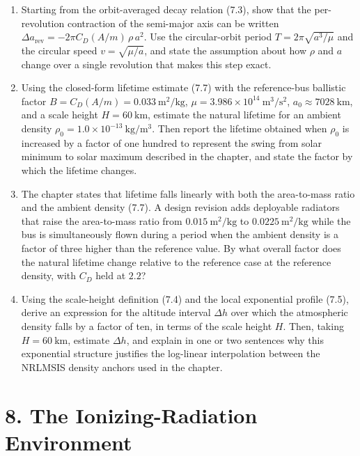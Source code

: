 \documentclass[
  11pt,
  openany,
  oneside]{book}
\begin{document}
\begin{enumerate}
\def\labelenumi{\arabic{enumi}.}
\item
  Starting from the orbit-averaged decay relation (7.3), show that the
  per-revolution contraction of the semi-major axis can be written
  \(\Delta a_{\mathrm{rev}} = -2\pi C_D (A/m)\,\rho\, a^2\). Use the
  circular-orbit period \(T = 2\pi\sqrt{a^3/\mu}\) and the circular
  speed \(v = \sqrt{\mu/a}\), and state the assumption about how
  \(\rho\) and \(a\) change over a single revolution that makes this
  step exact.
\item
  Using the closed-form lifetime estimate (7.7) with the reference-bus
  ballistic factor \(B = C_D(A/m) = 0.033\ \mathrm{m^2/kg}\),
  \(\mu = 3.986\times 10^{14}\ \mathrm{m^3/s^2}\),
  \(a_0 \approx 7028\ \mathrm{km}\), and a scale height
  \(H = 60\ \mathrm{km}\), estimate the natural lifetime for an ambient
  density \(\rho_0 = 1.0\times 10^{-13}\ \mathrm{kg/m^3}\). Then report
  the lifetime obtained when \(\rho_0\) is increased by a factor of one
  hundred to represent the swing from solar minimum to solar maximum
  described in the chapter, and state the factor by which the lifetime
  changes.
\item
  The chapter states that lifetime falls linearly with both the
  area-to-mass ratio and the ambient density (7.7). A design revision
  adds deployable radiators that raise the area-to-mass ratio from
  \(0.015\ \mathrm{m^2/kg}\) to \(0.0225\ \mathrm{m^2/kg}\) while the
  bus is simultaneously flown during a period when the ambient density
  is a factor of three higher than the reference value. By what overall
  factor does the natural lifetime change relative to the reference case
  at the reference density, with \(C_D\) held at \(2.2\)?
\item
  Using the scale-height definition (7.4) and the local exponential
  profile (7.5), derive an expression for the altitude interval
  \(\Delta h\) over which the atmospheric density falls by a factor of
  ten, in terms of the scale height \(H\). Then, taking
  \(H = 60\ \mathrm{km}\), estimate \(\Delta h\), and explain in one or
  two sentences why this exponential structure justifies the log-linear
  interpolation between the NRLMSIS density anchors used in the chapter.
\end{enumerate}

\chapter{8. The Ionizing-Radiation
Environment}\label{the-ionizing-radiation-environment}
\end{document}
